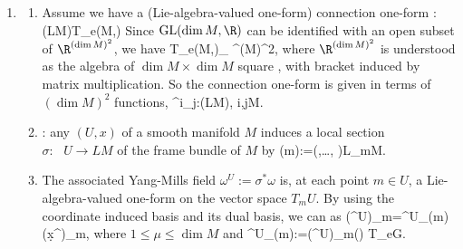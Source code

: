 \documentclass{article}
\newcommand{\GL}{\operatorname{GL}}
\newcommand{\cl}{:\text{ }}
\begin{document}
\begin{enumerate}
\begin{enumerate}
\end{enumerate}
\begin{itemize}
\item So 
    \item Note that, at each point $(m,g)\in U\times G$, we have
\bse
T_{(m,g)}(U\times G) \cong_{} T_mU\oplus T_gG.
\ese
\item {} Both the Yang-Mills field $\omega^U$ and the local representation $h^*\omega$ encode the  information carried by $\omega$ locally on $U$. {\tiny Since $h^*\omega$ involves $U\times G$ while $\omega^U$ doesn't, one might guess that $h^*\omega$ gives a more ``accurate'' picture of $\omega$ on $U$ than the Yang-Mills field. But in fact, this is not the case. They both contain the  about the connection one-form $\omega$.}
\item The above diagram is  principle bundle isomorphism, we are only care the local performances. But we still can define the pull-backs.
\end{itemize}

\item {}
\begin{enumerate}
\item 
Assume we have a (Lie-algebra-valued one-form) connection one-form 
\bse
\omega\cl \Gamma(LM)\xrightarrow{\sim}T_e\GL(\dim M,\R)
\ese
Since $\GL(\dim M,\R)$ can be identified with an open subset of $\R^{(\dim M)^2}$, we have
\bse
T_e\GL(\dim M,\R)\cong_{} \R^{(\dim M)^2},
\ese
where $\R^{(\dim M)^2}$ is understood as the algebra of $\dim M \times \dim M$ square , with bracket induced by matrix multiplication. 
So the connection one-form is given in terms of $(\dim M)^2$ functions,
\bse
\omega^i_{\phantom{i}j}\cl \Gamma(LM)\xrightarrow{\sim}\R, \leq i,j\leq \dim M.
\ese
    \item {}: any  $(U,x)$ of a smooth manifold $M$ induces a {local section} $\sigma\cl U\to LM$ of the frame bundle of $M$ by
\bse
\sigma(m):=\biggl(,\ldots, \biggr)\in L_mM.
\ese

\item {} The associated Yang-Mills field $\omega^U:=\sigma^*\omega$ is, at each point $m\in U$, a Lie-algebra-valued one-form on the vector space $T_mU$. By using the coordinate induced basis and its dual basis, we can  as
\bse
(\omega^U)_m=\omega^U_\mu(m)\,(\d x^\mu)_m,
\ese
where $1\leq \mu \leq \dim M$ and
\bse
\omega^U_\mu(m):=(\omega^U)_m\biggl(\biggr) \in T_eG.
\ese


\end{enumerate}
\end{enumerate}
\end{document}
